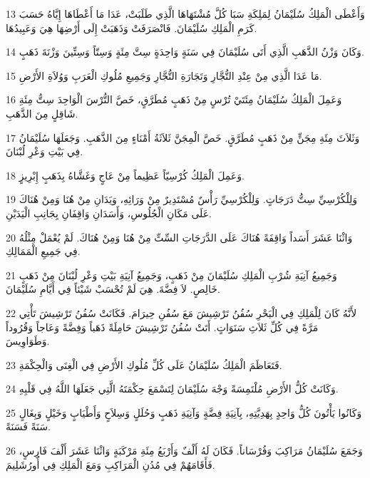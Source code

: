 \par 13 وَأَعْطَى الْمَلِكُ سُلَيْمَانُ لِمَلِكَةِ سَبَا كُلَّ مُشْتَهَاهَا الَّذِي طَلَبَتْ، عَدَا مَا أَعْطَاهَا إِيَّاهُ حَسَبَ كَرَمِ الْمَلِكِ سُلَيْمَانَ. فَانْصَرَفَتْ وَذَهَبَتْ إِلَى أَرْضِهَا هِيَ وَعَبِيدُهَا.
\par 14 وَكَانَ وَزْنُ الذَّهَبِ الَّذِي أَتَى سُلَيْمَانَ فِي سَنَةٍ وَاحِدَةٍ سِتَّ مِئَةٍ وَسِتّاً وَسِتِّينَ وَزْنَةَ ذَهَبٍ.
\par 15 مَا عَدَا الَّذِي مِنْ عِنْدِ التُّجَّارِ وَتَجَارَةِ التُّجَّارِ وَجَمِيعِ مُلُوكِ الْعَرَبِ وَوُلاَةِ الأَرْضِ.
\par 16 وَعَمِلَ الْمَلِكُ سُلَيْمَانُ مِئَتَيْ تُرْسٍ مِنْ ذَهَبٍ مُطَرَّقٍ، خَصَّ التُّرْسَ الْوَاحِدَ سِتُّ مِئَةِ شَاقِلٍ مِنَ الذَّهَبِ.
\par 17 وَثَلاَثَ مِئَةِ مِجَنٍّ مِنْ ذَهَبٍ مُطَرَّقٍ. خَصَّ الْمِجَنَّ ثَلاَثَةُ أَمْنَاءٍ مِنَ الذَّهَبِ. وَجَعَلَهَا سُلَيْمَانُ فِي بَيْتِ وَعْرِ لُبْنَانَ.
\par 18 وَعَمِلَ الْمَلِكُ كُرْسِيّاً عَظِيماً مِنْ عَاجٍ وَغَشَّاهُ بِذَهَبٍ إِبْرِيزٍ.
\par 19 وَلِلْكُرْسِيِّ سِتُّ دَرَجَاتٍ. وَلِلْكُرْسِيِّ رَأْسٌ مُسْتَدِيرٌ مِنْ وَرَائِهِ، وَيَدَانِ مِنْ هُنَا وَمِنْ هُنَاكَ عَلَى مَكَانِ الْجُلُوسِ، وَأَسَدَانِ وَاقِفَانِ بِجَانِبِ الْيَدَيْنِ.
\par 20 وَاثْنَا عَشَرَ أَسَداً وَاقِفَةً هُنَاكَ عَلَى الدَّرَجَاتِ السِّتِّ مِنْ هُنَا وَمِنْ هُنَاكَ. لَمْ يُعْمَلْ مِثْلُهُ فِي جَمِيعِ الْمَمَالِكِ.
\par 21 وَجَمِيعُ آنِيَةِ شُرْبِ الْمَلِكِ سُلَيْمَانَ مِنْ ذَهَبٍ، وَجَمِيعُ آنِيَةِ بَيْتِ وَعْرِ لُبْنَانَ مِنْ ذَهَبٍ خَالِصٍ. لاَ فِضَّةَ. هِيَ لَمْ تُحْسَبْ شَيْئاً فِي أَيَّامِ سُلَيْمَانَ.
\par 22 لأَنَّهُ كَانَ لِلْمَلِكِ فِي الْبَحْرِ سُفُنُ تَرْشِيشَ مَعَ سُفُنِ حِيرَامَ. فَكَانَتْ سُفُنُ تَرْشِيشَ تَأْتِي مَرَّةً فِي كُلِّ ثَلاَثِ سَنَوَاتٍ. أَتَتْ سُفُنُ تَرْشِيشَ حَامِلَةً ذَهَباً وَفِضَّةً وَعَاجاً وَقُرُوداً وَطَوَاوِيسَ.
\par 23 فَتَعَاظَمَ الْمَلِكُ سُلَيْمَانُ عَلَى كُلِّ مُلُوكِ الأَرْضِ فِي الْغِنَى وَالْحِكْمَةِ.
\par 24 وَكَانَتْ كُلُّ الأَرْضِ مُلْتَمِسَةً وَجْهَ سُلَيْمَانَ لِتَسْمَعَ حِكْمَتَهُ الَّتِي جَعَلَهَا اللَّهُ فِي قَلْبِهِ.
\par 25 وَكَانُوا يَأْتُونَ كُلُّ وَاحِدٍ بِهَدِيَّتِهِ، بِآنِيَةِ فِضَّةٍ وَآنِيَةِ ذَهَبٍ وَحُلَلٍ وَسِلاَحٍ وَأَطْيَابٍ وَخَيْلٍ وَبِغَالٍ سَنَةً فَسَنَةً.
\par 26 وَجَمَعَ سُلَيْمَانُ مَرَاكِبَ وَفُرْسَاناً. فَكَانَ لَهُ أَلْفٌ وَأَرْبَعُ مِئَةِ مَرْكَبَةٍ وَاثْنَا عَشَرَ أَلْفَ فَارِسٍ، فَأَقَامَهُمْ فِي مُدُنِ الْمَرَاكِبِ وَمَعَ الْمَلِكِ فِي أُورُشَلِيمَ.
